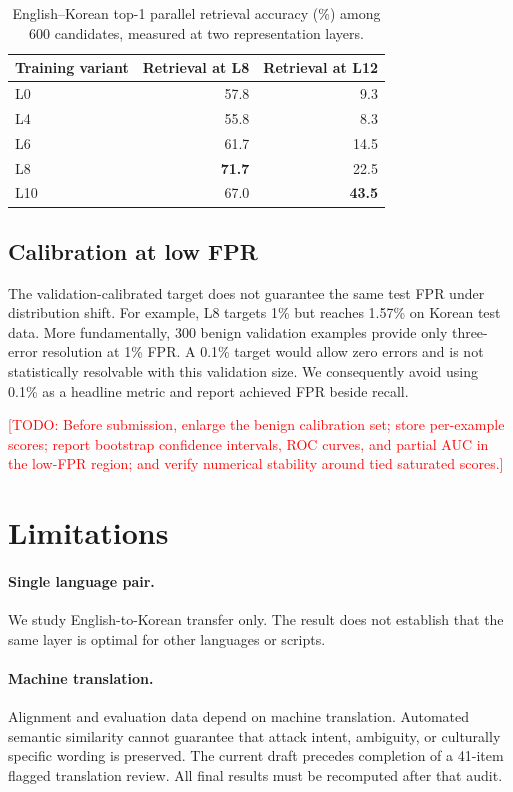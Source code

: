 \documentclass[10pt,twocolumn]{article}
\newcommand{\todo}[1]{\textcolor{red}{[TODO: #1]}}
\begin{document}
\begin{table}[t]
\centering
\small
\begin{tabular}{lrr}
\toprule
Training variant & Retrieval at L8 & Retrieval at L12 \\
\midrule
L0 & 57.8 & 9.3 \\
L4 & 55.8 & 8.3 \\
L6 & 61.7 & 14.5 \\
L8 & \textbf{71.7} & 22.5 \\
L10 & 67.0 & \textbf{43.5} \\
\bottomrule
\end{tabular}
\caption{English--Korean top-1 parallel retrieval accuracy (\%) among 600
candidates, measured at two representation layers.}
\label{tab:retrieval}
\end{table}

\subsection{Calibration at low FPR}

The validation-calibrated target does not guarantee the same test FPR under
distribution shift. For example, L8 targets 1\% but reaches 1.57\% on Korean
test data. More fundamentally, 300 benign validation examples provide only
three-error resolution at 1\% FPR. A 0.1\% target would allow zero errors and is
not statistically resolvable with this validation size. We consequently avoid
using 0.1\% as a headline metric and report achieved FPR beside recall.

\todo{Before submission, enlarge the benign calibration set; store per-example
scores; report bootstrap confidence intervals, ROC curves, and partial AUC in
the low-FPR region; and verify numerical stability around tied saturated
scores.}

\section{Limitations}

\paragraph{Single language pair.}
We study English-to-Korean transfer only. The result does not establish that
the same layer is optimal for other languages or scripts.

\paragraph{Machine translation.}
Alignment and evaluation data depend on machine translation. Automated semantic
similarity cannot guarantee that attack intent, ambiguity, or culturally
specific wording is preserved. The current draft precedes completion of a
41-item flagged translation review. All final results must be recomputed after
that audit.
\end{document}

